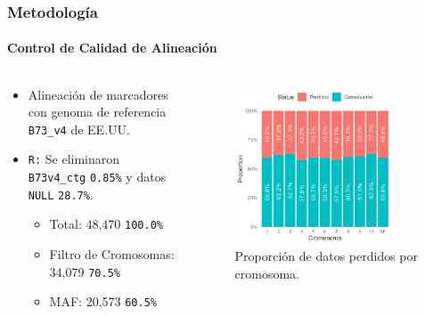 \documentclass[9pt,aspectratio=169]{beamer}
\begin{document}
\begin{frame}
    \frametitle{Metodología}
    \framesubtitle{Control de Calidad de Alineación}

\begin{columns}[c]

    \begin{column}{0.45\textwidth}
        \begin{itemize}
            \item Alineación de marcadores con genoma de referencia \texttt{B73\_v4} de EE.UU.
            \item \colorbox{ITESOblue!80}{\color{white}\texttt{R:}} Se eliminaron \texttt{B73v4\_ctg} \texttt{\color{gray}0.85\%} y datos \texttt{NULL} \texttt{\color{gray}28.7\%}.
                \begin{itemize}
                    \item Total: 48,470 \texttt{\color{gray}100.0\%}
                    \item Filtro de Cromosomas: 34,079 \texttt{\color{gray}70.5\%}
                    \item MAF: 20,573 \texttt{\color{gray}60.5\%}
                \end{itemize}
        \end{itemize}
    \end{column}

    \begin{column}{0.45\textwidth}
        \begin{figure}
            \centering
            \includegraphics[width=0.85\textwidth]{SiteSumChrom.png}
            \caption{Proporción de datos perdidos por cromosoma.}
            \label{fig:sitesumchrom}
        \end{figure}
    \end{column}
\end{columns}

\end{frame}
\end{document}
